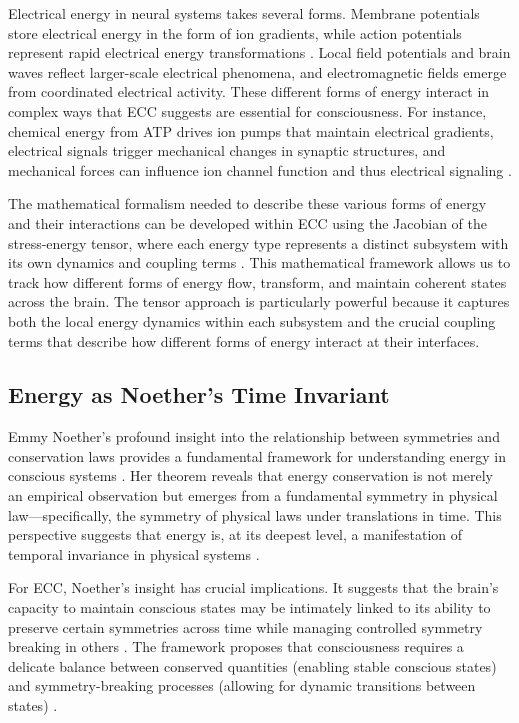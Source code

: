 Electrical energy in neural systems takes several forms. Membrane potentials store electrical energy in the form of ion gradients, while action potentials represent rapid electrical energy transformations \cite{Street2016}. Local field potentials and brain waves reflect larger-scale electrical phenomena, and electromagnetic fields emerge from coordinated electrical activity. These different forms of energy interact in complex ways that ECC suggests are essential for consciousness. For instance, chemical energy from ATP drives ion pumps that maintain electrical gradients, electrical signals trigger mechanical changes in synaptic structures, and mechanical forces can influence ion channel function and thus electrical signaling \cite{Laughlin2005}.

The mathematical formalism needed to describe these various forms of energy and their interactions can be developed within ECC using the Jacobian of the stress-energy tensor, where each energy type represents a distinct subsystem with its own dynamics and coupling terms \cite{Coopersmith2017}. This mathematical framework allows us to track how different forms of energy flow, transform, and maintain coherent states across the brain. The tensor approach is particularly powerful because it captures both the local energy dynamics within each subsystem and the crucial coupling terms that describe how different forms of energy interact at their interfaces.

\subsection{Energy as Noether's Time Invariant}

Emmy Noether's profound insight into the relationship between symmetries and conservation laws provides a fundamental framework for understanding energy in conscious systems \cite{Kosmann-Schwarzbach2011}. Her theorem reveals that energy conservation is not merely an empirical observation but emerges from a fundamental symmetry in physical law—specifically, the symmetry of physical laws under translations in time. This perspective suggests that energy is, at its deepest level, a manifestation of temporal invariance in physical systems \cite{Neuenschwander2017}.

For ECC, Noether's insight has crucial implications. It suggests that the brain's capacity to maintain conscious states may be intimately linked to its ability to preserve certain symmetries across time while managing controlled symmetry breaking in others \cite{Brading2002}. The framework proposes that consciousness requires a delicate balance between conserved quantities (enabling stable conscious states) and symmetry-breaking processes (allowing for dynamic transitions between states) \cite{Weyl1952}.

